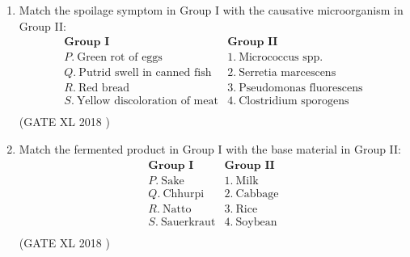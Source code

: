 \documentclass[14pt]{extarticle}
\begin{document}
\begin{flushleft}
\begin{enumerate}
\item Match the spoilage symptom in Group I with the causative microorganism in Group II:
\[
\begin{array}{ll}
\textbf{Group I} & \textbf{Group II} \\
P. \ \text{Green rot of eggs} & 1. \ \text{Micrococcus spp.} \\
Q. \ \text{Putrid swell in canned fish} & 2. \ \text{Serretia marcescens} \\
R. \ \text{Red bread} & 3. \ \text{Pseudomonas fluorescens} \\
S. \ \text{Yellow discoloration of meat} & 4. \ \text{Clostridium sporogens} \\
\end{array}
\]
\hfill(GATE XL 2018 )\\
\begin{enumerate}
\end{enumerate}

\item Match the fermented product in Group I with the base material in Group II:
\[
\begin{array}{ll}
\textbf{Group I} & \textbf{Group II} \\
P. \ \text{Sake} & 1. \ \text{Milk} \\
Q. \ \text{Chhurpi} & 2. \ \text{Cabbage} \\
R. \ \text{Natto} & 3. \ \text{Rice} \\
S. \ \text{Sauerkraut} & 4. \ \text{Soybean} \\
\end{array}
\]
\hfill(GATE XL 2018 )\\

\begin{enumerate}
\end{enumerate}


\end{enumerate}
\end{flushleft}
\end{document}
